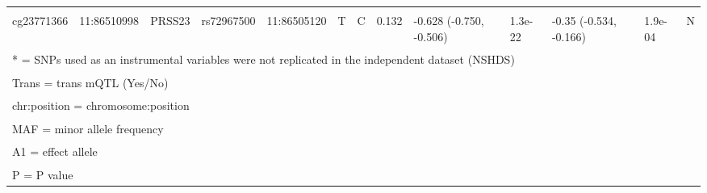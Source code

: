\documentclass[11pt,twoside]{bristolthesis}
\begin{document}
\begin{landscape}
\begin{table}[!h]
{\begin{tabular}[t]{lllllllllllll}
\cellcolor{gray!6}{cg11660018} & \cellcolor{gray!6}{11:86510915} & \cellcolor{gray!6}{PRSS23} & \cellcolor{gray!6}{rs1939110} & \cellcolor{gray!6}{11:86515072} & \cellcolor{gray!6}{T} & \cellcolor{gray!6}{C} & \cellcolor{gray!6}{0.286} & \cellcolor{gray!6}{-0.404 (-0.498, -0.309)} & \cellcolor{gray!6}{2.6e-16} & \cellcolor{gray!6}{-0.229 (-0.385, -0.073)} & \cellcolor{gray!6}{4.0e-03} & \cellcolor{gray!6}{N}\\
\addlinespace
cg23771366 & 11:86510998 & PRSS23 & rs72967500 & 11:86505120 & T & C & 0.132 & -0.628 (-0.750, -0.506) & 1.3e-22 & -0.35 (-0.534, -0.166) & 1.9e-04 & N\\
\bottomrule
\multicolumn{13}{l}{\textsuperscript{} * = SNPs used as an instrumental variables were not replicated in the independent dataset (NSHDS)}\\
\multicolumn{13}{l}{\textsuperscript{} Trans = trans mQTL (Yes/No)}\\
\multicolumn{13}{l}{\textsuperscript{} chr:position = chromosome:position}\\
\multicolumn{13}{l}{\textsuperscript{} MAF = minor allele frequency}\\
\multicolumn{13}{l}{\textsuperscript{} A1 = effect allele}\\
\multicolumn{13}{l}{\textsuperscript{} P = P value}\\
\end{tabular}}
\end{table}
\end{landscape}
\end{document}
